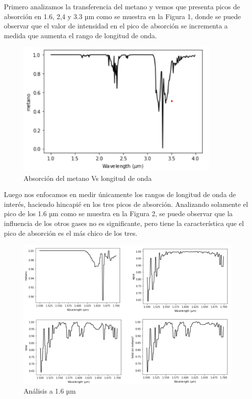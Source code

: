 \documentclass[titlepage,11pt]{article}
\begin{document}
Primero analizamos la transferencia del metano y vemos que presenta picos de absorción en 1.6, 2,4 y 3.3 µm como se muestra en la Figura 1, donde se puede observar que el valor de intensidad en el pico de absorción se incrementa a medida que aumenta el rango de longitud de onda.

\begin{figure}[htb!]
    \centering
    \includegraphics[width=10cm]{fig/absorbmetano.png}
    \caption{Absorción del metano Vs longitud de onda}
    \label{fig:absorbMetano}
\end{figure}


Luego nos enfocamos en medir únicamente los rangos de longitud de onda de interés, haciendo hincapié en los tres picos de absorción.
Analizando solamente el pico de los 1.6 µm como se muestra en la Figura 2, se puede observar que la influencia de los otros gases no es significante, pero tiene la característica que el pico de absorción es el más chico de los tres.

\begin{figure}[htb!]
    \centering
    \includegraphics[width=15cm]{fig/analisis16.png}
    \caption{Análisis a 1.6 µm}
    \label{fig:analisis16}
\end{figure}
\end{document}
